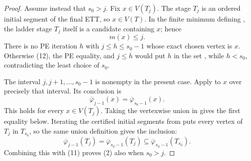 \begin{proof}
Assume instead that \(s_0>j\).  Fix \(x\in V(T_j)\).  The stage \(T_j\)
is an ordered initial segment of the final ETT, so \(x\in V(T)\).  In the
finite minimum defining , the ladder
stage \(T_j\) itself is a candidate containing \(x\); hence
\[
                              m(x)\leq j.                        \tag{12}
\]
There is no PE iteration \(h\) with \(j\leq h\leq s_0-1\) whose exact
chosen vertex is \(x\).  Otherwise (12), the PE equality, and \(j\leq h\)
would put \(h\) in the set , while
\(h<s_0\), contradicting the least choice of \(s_0\).

The interval \(j,j+1,\ldots,s_0-1\) is nonempty in the present case.
Apply  to \(x\) over precisely that
interval.  Its conclusion is
\[
             \overline\varphi_{j-1}(x)
                 =\overline\varphi_{s_0-1}(x).                 \tag{13}
\]
This holds for every \(x\in V(T_j)\).  Taking the vertexwise union in
 gives the first equality below.  Iterating
the certified initial segments from  puts
every vertex of \(T_j\) in \(T_{s_0}\), so the same union definition gives
the inclusion:
\[
 \overline\varphi_{j-1}(T_j)
   =\overline\varphi_{s_0-1}(T_j)
   \subseteq\overline\varphi_{s_0-1}(T_{s_0}).
\]
Combining this with (11) proves (2) also when \(s_0>j\).
\end{proof}
